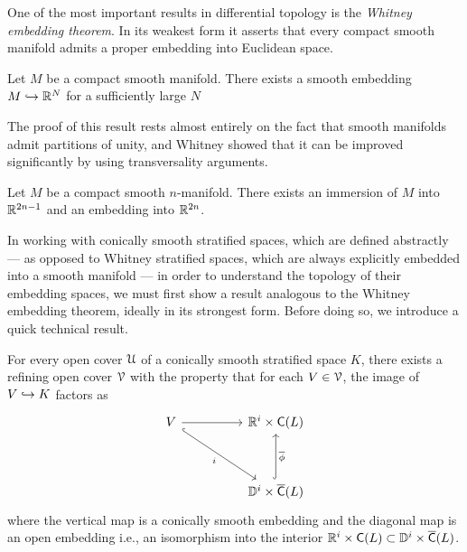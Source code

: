 One of the most important results in differential topology is the \emph{Whitney embedding theorem}. In its weakest form it asserts that every compact smooth manifold admits a proper embedding into Euclidean space.

\begin{theorem}\label{ch4:: thm: Whitney weak}
    Let $M$ be a compact smooth manifold. There exists a smooth embedding $M \hookrightarrow \mathbb R^{N}$ for a sufficiently large $N$
\end{theorem}

\noindent The proof of this result rests almost entirely on the fact that smooth manifolds admit partitions of unity, and Whitney showed that it can be improved significantly by using transversality arguments. 

\begin{theorem}\label{ch4:: them: Whitney strong}
    \label{thm:ch7::whitney strong}
Let $M$ be a compact smooth $n$-manifold. There exists an immersion of $M$ into $\mathbb R^{2n-1}$ and an embedding into $\mathbb R^{2n}$.     
\end{theorem}

In working with conically smooth stratified spaces, which are defined abstractly — as opposed to Whitney stratified spaces, which are always explicitly embedded into a smooth manifold — in order to understand the topology of their embedding spaces, we must first show a result analogous to the Whitney embedding theorem, ideally in its strongest form. Before doing so, we introduce a quick technical result.

\begin{lemma}\cite[Lemma~1.3.1]{AFR1}\label{ch4:: lem: shrinking} For every open cover $\mathcal U$ of a conically smooth stratified space $K$, there exists a refining open cover $\mathcal V$ with the property that for each $V\in \mathcal V$, the image of $V \hookrightarrow K$ factors as
    \begin{equation}
        \begin{tikzcd}
            V && {\RR^{i}\times \sC(L)} \\
            \\
            && {\DD^{i}\times \overline{\sC}(L)}
            \arrow[from=1-1, to=1-3]
            \arrow["i"', hook, from=1-1, to=3-3]
            \arrow["{\overline{\phi}}"', hook, from=3-3, to=1-3]
        \end{tikzcd}
    \end{equation}
    where the vertical map is a conically smooth embedding and the diagonal map is an open embedding i.e., an isomorphism into the interior $\mathbb R^{i}\times \mathsf C(L) \subset \mathbb D^{i}\times \overline{\mathsf C}(L)$.
\end{lemma}

